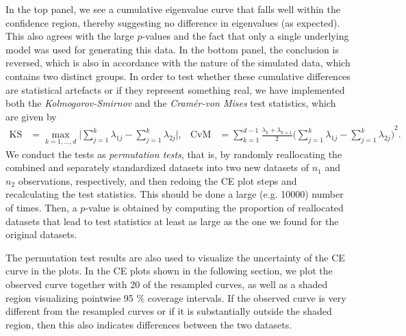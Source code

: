 \documentclass[a4paper,14pt]{article}
\begin{document}
In the top panel, we see a cumulative eigenvalue curve that falls well within the confidence region, thereby suggesting no difference in eigenvalues (as expected). This also agrees with the large $p$-values and the fact that only a single underlying model was used for generating this data. In the bottom panel, the conclusion is reversed, which is also in accordance with the nature of the simulated data, which contains two distinct groups. In order to test whether these cumulative differences are statistical artefacts or if they represent something real, we have implemented both the \emph{Kolmogorov-Smirnov} and the \emph{Cram\'er-von Mises} test statistics, which are given by
\begin{align*}
\text{KS} &= \max_{k=1,\dotsc,d} \bigg\lvert \sum_{j=1}^k \lambda_{1j} - \sum_{j=1}^k \lambda_{2j} \bigg\rvert, &
\text{CvM} &= \sum_{k=1}^{d-1} \frac{\lambda_k + \lambda_{k+1}}{2} {\bigg( \sum_{j=1}^k \lambda_{1j} - \sum_{j=1}^k \lambda_{2j} \bigg)}^2.
\end{align*}
We conduct the tests as \textit{permutation tests}, that is, by randomly reallocating the combined and separately standardized datasets into two new datasets of $n_1$ and $n_2$ observations, respectively, and then redoing the CE plot steps and recalculating the test statistics. This should be done a large (e.g. 10000) number of times. Then, a $p$-value is obtained by computing the proportion of reallocated datasets that lead to %
test statistics at least as large as %
the one we found for the original datasets.

The permutation test results are also used to visualize the uncertainty of the CE curve in the plots. In the CE plots shown in the following section, we plot the observed curve together with 20 of the resampled curves, as well as a shaded region visualizing pointwise 95 \% coverage intervals. If the observed curve is very different from the resampled curves or if it is substantially outside the shaded region, then this also indicates differences between the two datasets.
\end{document}
